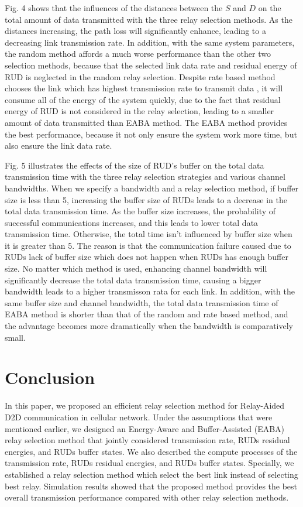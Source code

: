 \documentclass[conference]{IEEEtran}
\begin{document}
Fig. 4 shows that the influences of the distances between the $S$ and $D$ on the total amount of data transmitted with the three relay selection methods. As the distances increasing, the path loss will significantly enhance, leading to a decreasing link transmission rate. In addition, with the same system parameters, the random method affords a much worse performance than the other two selection methods, because that the selected link data rate and residual energy of RUD is neglected in the random relay selection. Despite rate based method chooses the link which has highest transmission rate to transmit data , it will consume all of the energy of the system quickly, due to the fact that residual energy of RUD is not considered in the relay selection, leading to a smaller amount of data transmitted than EABA method. The EABA method provides the best performance, because it not only ensure the system work more time, but also ensure the link data rate.

Fig. 5 illustrates the effects of the size of RUD's buffer on the total data transmission time with the three relay selection strategies and various channel bandwidths. When we specify a bandwidth and a relay selection method, if buffer size is less than 5, increasing the buffer size of RUDs leads to a decrease in the total data transmission time. As the buffer size increases, the probability of successful communications increases, and this leads to lower total data transmission time. Otherwise, the total time isn't influenced by buffer size when it is greater than 5. The reason is that the communication failure caused due to RUDs lack of buffer size which does not happen when RUDs has enough buffer size. No matter which method is used, enhancing channel bandwidth will significantly decrease the total data transmission time, causing a bigger bandwidth leads to a higher transmisson rata for each link. In addition, with the same buffer size and channel bandwidth, the total data transmission time of EABA method is shorter than that of the random and rate based method, and the advantage becomes more dramatically when the bandwidth is comparatively small.

\section{Conclusion}
In this paper, we proposed an efficient relay selection method for Relay-Aided D2D communication in cellular network. Under the assumptions that were mentioned earlier,  we designed an Energy-Aware and Buffer-Assisted (EABA) relay selection method that jointly considered transmission rate, RUDs residual energies, and RUDs buffer states. We also described the compute processes of the transmission rate, RUDs residual energies, and RUDs buffer states. Specially, we established a relay selection method which select the best link instead of selecting best relay. Simulation results showed that the proposed method provides the best overall transmission performance compared with other relay selection methods.
\end{document}
